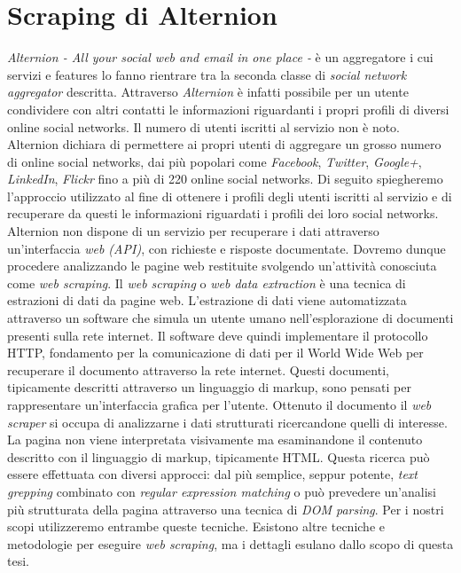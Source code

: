 \section{Scraping di Alternion}
\textit{Alternion - All your social web and email in one place -} è un aggregatore i cui servizi e features lo fanno rientrare tra la seconda classe di \textit{social network aggregator} descritta. Attraverso \textit{Alternion} è infatti possibile per un utente condividere con altri contatti le informazioni riguardanti i propri profili di diversi online social networks. Il numero di utenti iscritti al servizio non è noto. Alternion dichiara di permettere ai propri utenti di aggregare un grosso numero di online social networks, dai più popolari come \textit{Facebook}, \textit{Twitter}, \textit{Google+}, \textit{LinkedIn}, \textit{Flickr} fino a più di 220 online social networks.
Di seguito spiegheremo l'approccio utilizzato al fine di ottenere i profili degli utenti iscritti al servizio e di recuperare da questi le informazioni riguardati i profili dei loro social networks. Alternion non dispone di un servizio per recuperare i dati attraverso un'interfaccia \textit{web (API)}, con richieste e risposte documentate. Dovremo dunque procedere analizzando le pagine web restituite svolgendo un'attività conosciuta come \textit{web scraping}.
Il \textit{web scraping} o \textit{web data extraction} è una tecnica di estrazioni di dati da pagine web. L'estrazione di dati viene automatizzata attraverso un software che simula un utente umano nell'esplorazione di documenti presenti sulla rete internet. Il software deve quindi implementare il protocollo HTTP, fondamento per la comunicazione di dati per il World Wide Web per recuperare il documento attraverso la rete internet. Questi documenti, tipicamente descritti attraverso un linguaggio di markup, sono pensati per rappresentare un'interfaccia grafica per l'utente. Ottenuto il documento il \textit{web scraper} si occupa di analizzarne i dati strutturati ricercandone quelli di interesse. La pagina non viene interpretata visivamente ma esaminandone il contenuto descritto con il linguaggio di markup, tipicamente HTML. Questa ricerca può essere effettuata con diversi approcci: dal più semplice, seppur potente, \textit{text grepping} combinato con \textit{regular expression matching} o può prevedere un'analisi più strutturata della pagina attraverso una tecnica di \textit{DOM parsing}. Per i nostri scopi utilizzeremo entrambe queste tecniche. Esistono altre tecniche e metodologie per eseguire \textit{web scraping}, ma i dettagli esulano dallo scopo di questa tesi.
